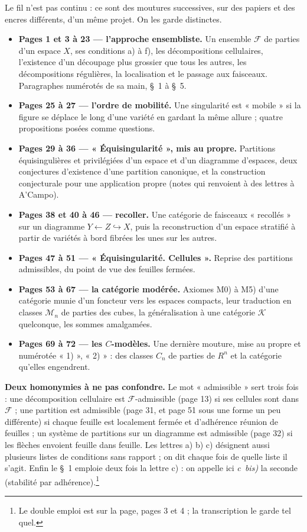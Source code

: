 \documentclass[11pt,a4paper]{article}
\begin{document}
Le fil n'est pas continu : ce sont des moutures successives, sur des papiers et
des encres différents, d'un même projet. On les garde distinctes.

\begin{itemize}
\item \textbf{Pages 1 et 3 à 23 — l'approche ensembliste.} Un ensemble
  $\mathcal{F}$ de parties d'un espace $X$, ses conditions a) à f), les
  décompositions cellulaires, l'existence d'un découpage plus grossier que tous
  les autres, les décompositions régulières, la localisation et le passage aux
  faisceaux. Paragraphes numérotés de sa main, §~1 à §~5.
\item \textbf{Pages 25 à 27 — l'ordre de mobilité.} Une singularité est
  « mobile » si la figure se déplace le long d'une variété en gardant la même
  allure ; quatre propositions posées comme questions.
\item \textbf{Pages 29 à 36 — « Équisingularité », mis au propre.} Partitions
  équisingulières et privilégiées d'un espace et d'un diagramme d'espaces, deux
  conjectures d'existence d'une partition canonique, et la construction
  conjecturale pour une application propre (notes qui renvoient à des lettres à A'Campo).
\item \textbf{Pages 38 et 40 à 46 — recoller.} Une catégorie de faisceaux
  « recollés » sur un diagramme $Y \leftarrow Z \hookrightarrow X$, puis la
  reconstruction d'un espace stratifié à partir de variétés à bord fibrées les
  unes sur les autres.
\item \textbf{Pages 47 à 51 — « Équisingularité. Cellules ».} Reprise des
  partitions admissibles, du point de vue des feuilles fermées.
\item \textbf{Pages 53 à 67 — la catégorie modérée.} Axiomes M0) à M5) d'une
  catégorie munie d'un foncteur vers les espaces compacts, leur traduction en
  classes $\mathcal{M}_n$ de parties des cubes, la généralisation à une
  catégorie $\mathcal{K}$ quelconque, les sommes amalgamées.
\item \textbf{Pages 69 à 72 — les $C$-modèles.} Une dernière mouture, mise au
  propre et numérotée « 1) », « 2) » : des classes $C_n$ de parties de $R^n$
  et la catégorie qu'elles engendrent.
\end{itemize}

\textbf{Deux homonymies à ne pas confondre.} Le mot « admissible » sert trois
fois : une décomposition cellulaire est $\mathcal{F}$-admissible (page 13) si
ses cellules sont dans $\mathcal{F}$ ; une partition est admissible (page 31,
et page 51 sous une forme un peu différente) si chaque feuille est localement
fermée et d'adhérence réunion de feuilles ; un système de partitions sur un
diagramme est admissible (page 32) si les flèches envoient feuille dans
feuille. Les lettres a) b) c) désignent aussi plusieurs listes de conditions
sans rapport ; on dit chaque fois de quelle liste il s'agit. Enfin le §~1
emploie deux fois la lettre c) : on appelle ici \emph{c~bis)} la seconde
(stabilité par adhérence).\footnote{Le double emploi est sur la page, pages 3
et 4 ; la transcription le garde tel quel.}
\end{document}
